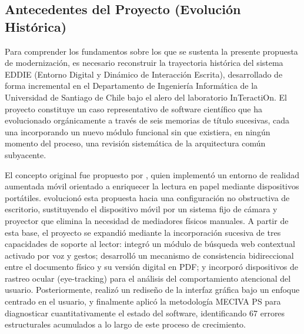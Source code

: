 \subsection{Antecedentes del Proyecto (Evolución Histórica)}
Para comprender los fundamentos sobre los que se sustenta la presente propuesta de modernización, es necesario reconstruir la trayectoria histórica del sistema EDDIE (Entorno Digital y Dinámico de Interacción Escrita), desarrollado de forma incremental en el Departamento de Ingeniería Informática de la Universidad de Santiago de Chile bajo el alero del laboratorio InTeractiOn. El proyecto constituye un caso representativo de software científico que ha evolucionado orgánicamente a través de seis memorias de título sucesivas, cada una incorporando un nuevo módulo funcional sin que existiera, en ningún momento del proceso, una revisión sistemática de la arquitectura común subyacente.

El concepto original fue propuesto por \cite{carrasco2017diseno}, quien implementó un entorno de realidad aumentada móvil orientado a enriquecer la lectura en papel mediante dispositivos portátiles. \cite{contreras2019desarrollo} evolucionó esta propuesta hacia una configuración no obstructiva de escritorio, sustituyendo el dispositivo móvil por un sistema fijo de cámara y proyector que elimina la necesidad de mediadores físicos manuales. A partir de esta base, el proyecto se expandió mediante la incorporación sucesiva de tres capacidades de soporte al lector: \cite{montanares2019desarrollo} integró un módulo de búsqueda web contextual activado por voz y gestos; \cite{pezoa2020implementacion} desarrolló un mecanismo de consistencia bidireccional entre el documento físico y su versión digital en PDF; y \cite{estay2020integracion} incorporó dispositivos de rastreo ocular (eye-tracking) para el análisis del comportamiento atencional del usuario. Posteriormente, \cite{santibanez2020rediseno} realizó un rediseño de la interfaz gráfica bajo un enfoque centrado en el usuario, y finalmente \cite{ibaceta2023evaluacion} aplicó la metodología MECIVA PS para diagnosticar cuantitativamente el estado del software, identificando 67 errores estructurales acumulados a lo largo de este proceso de crecimiento.

